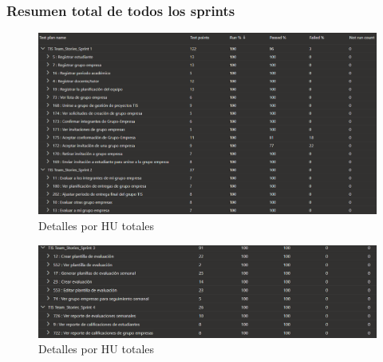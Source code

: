 \documentclass[12pt,letterpaper]{article}
\begin{document}
\subsubsection{Resumen total de todos los sprints}
 \begin{figure}[H]
        \centering
        \includegraphics[width=1.13\linewidth]{1.png}
        \caption{Detalles por HU totales}
    \end{figure}

 \begin{figure}[H]
        \centering
        \includegraphics[width=1.13\linewidth]{2.png}
        \caption{Detalles por HU totales}
    \end{figure}






\end{document}
